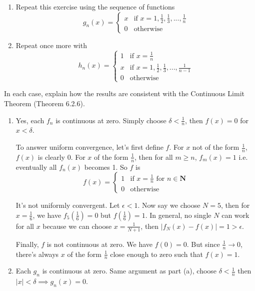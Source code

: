 \documentclass{oxmathproblems}
\begin{document}
\begin{questions}
\begin{enumerate}[label=(\alph*)]
  Is each $f_{n}$ continuous at zero? Does $f_{n} \to f$ uniformly on \textbf{R}? Is $f$ continuous at zero?
  \item Repeat this exercise using the sequence of functions
    \[
      g_{n}(x) = \begin{cases}
        x & \text{if } x = 1, \frac{1}{2}, \frac{1}{3}, ..., \frac{1}{n}\\
        0 & \text{otherwise}
      \end{cases}
  \]
  \item Repeat once more with
    \[
      h_{n}(x) = \begin{cases}
        1 & \text{if } x = \frac{1}{n}\\
        x & \text{if } x = 1, \frac{1}{2}, \frac{1}{3}, ..., \frac{1}{n-1}\\
        0 & \text{otherwise}
      \end{cases}
  \]
\end{enumerate}
 In each case, explain how the results are consistent with the Continuous Limit Theorem (Theorem 6.2.6).

\begin{solution}
  \begin{enumerate}[label=(\alph*)]
    \item Yes, each $f_{n}$ is continuous at zero. Simply choose $\delta < \frac{1}{n}$, then $f(x)=0$ for $x < \delta$.
    
    To answer uniform convergence, let's first define $f$. For $x$ not of the form $\frac{1}{n}$, $f(x)$ is clearly 0. For $x$ of the form $\frac{1}{n}$, then
    for all $m \geq n$, $f_{m}(x)=1$ i.e. eventually all $f_{n}(x)$ becomes 1. So $f$ is
    \[
      f(x) = \begin{cases}
        1 & \text{if } x = \frac{1}{n} \text{ for } n \in \textbf{N}\\
        0 & \text{otherwise}
      \end{cases}
   \]

   It's not uniformly convergent. Let $\epsilon < 1$. Now say we choose $N=5$, then for $x = \frac{1}{6}$,
   we have $f_{5}(\frac{1}{6})=0$ but $f(\frac{1}{6})=1$.
   In general, no single $N$ can work for all $x$ because we can choose $x = \frac{1}{N+1}$, then $|f_{N}(x)-f(x)|=1 > \epsilon$.

   Finally, $f$ is not continuous at zero. We have $f(0)=0$. But since $\frac{1}{n} \to 0$, there's always $x$ of the form $\frac{1}{n}$ close enough to zero
   such that $f(x)=1$.

   \item Each $g_{n}$ is continuous at zero. Same argument as part (a), choose $\delta < \frac{1}{n}$ then $|x| < \delta \implies g_{n}(x)=0$.
   

\end{enumerate}
\end{solution}
\end{questions}
\end{document}
